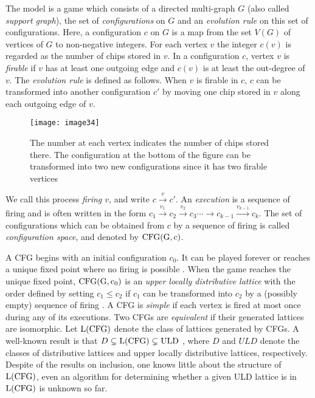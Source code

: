 \documentclass{article}
\theoremstyle{definition}
\begin{document}
The model is a game which consists of a directed multi-graph $G$ (also called \emph{support graph}), the set of \emph{configurations} on $G$ and an \emph{evolution rule} on this set of configurations. Here, a configuration $c$ on $G$ is a map from the set $V(G)$ of vertices of $G$ to non-negative integers. For each vertex $v$ the integer $c(v)$ is regarded as the number of chips stored in $v$. In a configuration $c$, vertex $v$ is \emph{firable} if $v$ has at least one outgoing edge and $c(v)$ is at least the out-degree of $v$. The \emph{evolution rule} is defined as follows. When $v$ is firable in $c$, $c$ can be transformed into another configuration $c'$ by moving one chip stored in $v$ along each outgoing edge of $v$. 
\begin{SCfigure} \centering
\texttt{[image: image34]}
  \caption{The number at each vertex indicates the number of chips stored there. The configuration at the bottom of the figure can be transformed into two new configurations since it has two firable vertices}
  \label{fig:image34}
\end{SCfigure}
We call this process \emph{firing $v$}, and write $c\overset{v}{\to}c'$. An \emph{execution} is a sequence of firing and is often written in the form $c_1\overset{v_1}{\to}c_2\overset{v_2}{\to}c_3\cdots\to c_{k-1}\overset{v_{k-1}}{\to}c_k$. The set of configurations which can be obtained from $c$ by a sequence of firing is called \emph{configuration space}, and denoted by ${\rm CFG(G,c)}$. 

A CFG begins with an initial configuration $c_0$. It can be played forever or reaches a unique fixed point where no firing is possible \cite{Eri93}. When the game reaches the unique fixed point, ${\rm CFG(G,c_0)}$ is an \emph{upper locally distributive lattice} with the order defined by setting $c_1\leq c_2$ if $c_1$ can be transformed into $c_2$ by a (possibly empty) sequence of firing  \cite{LP01}. A CFG is \emph{simple} if each vertex is fired at most once during any of its executions. Two CFGs are \emph{equivalent} if their generated lattices are isomorphic. Let ${\rm L(CFG)}$ denote the class of lattices generated by CFGs. A well-known result is that $D\subsetneq {\rm L(CFG)\subsetneq ULD}$  \cite{MVP01}, where $D$ and $ULD$ denote the classes of distributive lattices and upper locally distributive lattices, respectively. Despite of the results on inclusion, one knows little about the structure of ${\rm L(CFG)}$, even an algorithm for determining whether a given ULD lattice is in ${\rm L(CFG)}$ is unknown so far.
\end{document}
